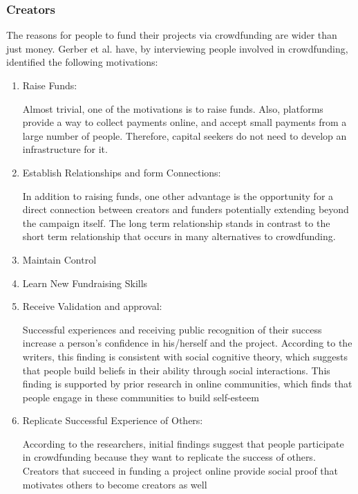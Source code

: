 \subsubsection*{Creators}
The reasons for people to fund their projects via crowdfunding are wider than just money. Gerber et al. \cite{inproceedings} 
have, by interviewing people involved in crowdfunding, identified the following motivations:
\begin{enumerate}
      \item Raise Funds:
            
      Almost trivial, one of the motivations is to raise funds. Also, platforms provide a way to
            collect payments online, and accept small payments from a large number of people. Therefore, capital
            seekers do not need to develop an infrastructure for it.

      \item Establish Relationships and form Connections:
            
      In addition to raising funds, one other advantage is the opportunity for a direct
            connection between creators and funders potentially extending beyond the campaign itself. The
            long term relationship stands in contrast to the short term relationship that occurs in many alternatives
            to crowdfunding.

      \item Maintain Control

      \item Learn New Fundraising Skills

      \item Receive Validation and approval:
            
      Successful experiences and receiving public recognition of their success increase
            a person’s confidence in his/herself and the project. According to the writers, this finding is consistent
            with social cognitive theory, which suggests that people build beliefs in their ability through social interactions. This finding is supported by prior research in online communities, which finds that people
            engage in these communities to build self-esteem

      \item Replicate Successful Experience of Others:
           
      According to the researchers, initial findings suggest that
            people participate in crowdfunding because they want to replicate the success of others. Creators that
            succeed in funding a project online provide social proof that motivates others to become creators as
            well


\end{enumerate}
